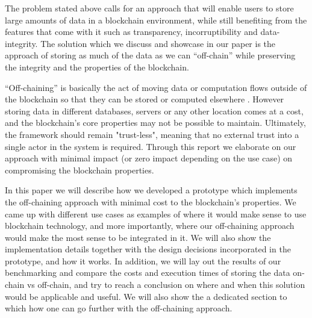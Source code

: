 The problem stated above calls for an approach that will enable users to store large amounts of data in a blockchain environment, while still benefiting from the features that come with it such as transparency, incorruptibility and data-integrity. The solution which we discuss and showcase in our paper is the approach of storing as much of the data as we can “off-chain” while preserving the integrity and the properties of the blockchain.

“Off-chaining” is basically the act of moving data or computation flows outside of the blockchain so that they can be stored or computed elsewhere \cite{Eberhardt2017}. However storing data in different databases, servers or any other location comes at a cost, and the blockchain’s core properties may not be possible to maintain. Ultimately, the framework should remain "trust-less", meaning that no external trust into a single actor in the system is required. Through this report we elaborate on our approach with minimal impact (or zero impact depending on the use case) on compromising the blockchain properties.

In this paper we will describe how we developed a prototype which implements the off-chaining approach with minimal cost to the blockchain’s properties. We came up with different use cases as examples of where it would make sense to use blockchain technology, and more importantly, where our off-chaining approach would make the most sense to be integrated in it. We will also show the implementation details together with the design decisions incorporated in the prototype, and how it works. In addition, we will lay out the results of our benchmarking and compare the costs and execution times of storing the data on-chain vs off-chain, and try to reach a conclusion on where and when this solution would be applicable and useful. We will also show the a dedicated section to which how one can go further with the off-chaining approach. 

\newpage
